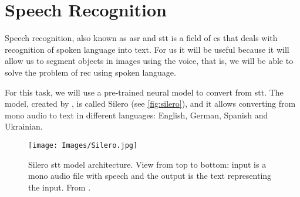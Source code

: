 \section{Speech Recognition}%
\label{sec:speech}

Speech recognition, also known as \gls{asr} and \gls{stt} is a field of
\gls{cs} that deals with recognition of spoken language into text. For us it
will be useful because it will allow us to segment objects in images using the
voice, that is, we will be able to solve the problem of \gls{rec} using spoken
language.

For this task, we will use a pre-trained neural model to convert from
\gls{stt}. The model, created by
, is called Silero (see
\vref{fig:silero}), and it allows converting from mono audio to text in
different languages: English, German, Spanish and Ukrainian.

\begin{figure}[p]
  \centering
  \texttt{[image: Images/Silero.jpg]}
  \caption[Silero  model architecture]{Silero \acf{stt} model
    architecture. View from top to bottom: input is a mono audio file with
    speech and the output is the text representing the input. From
    .}\label{fig:silero}
\end{figure}
